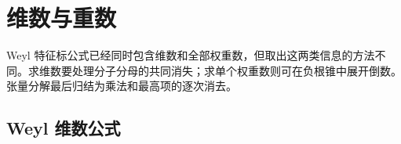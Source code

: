 %
%

\section{维数与重数}
\label{b5:sec:1905}

Weyl 特征标公式已经同时包含维数和全部权重数，但取出这两类信息的方法不同。求维数要处理分子分母的共同消失；求单个权重数则可在负根锥中展开倒数。张量分解最后归结为乘法和最高项的逐次消去。

\subsection{Weyl 维数公式}
\label{b5:subsec:1905:01}

